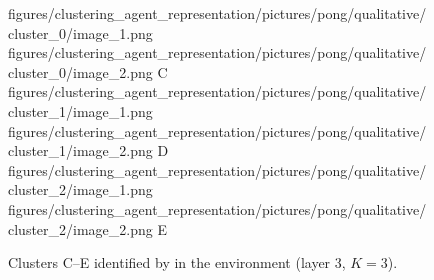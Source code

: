 \begin{figure}[H]
    \qualitativeClusterFigureSetup
    \qualitativeClusterTwo
        {figures/clustering_agent_representation/pictures/pong/qualitative/cluster_0/image_1.png}
        {figures/clustering_agent_representation/pictures/pong/qualitative/cluster_0/image_2.png}
        {C}
    \qualitativeClusterTwo
        {figures/clustering_agent_representation/pictures/pong/qualitative/cluster_1/image_1.png}
        {figures/clustering_agent_representation/pictures/pong/qualitative/cluster_1/image_2.png}
        {D}
    \qualitativeClusterTwo
        {figures/clustering_agent_representation/pictures/pong/qualitative/cluster_2/image_1.png}
        {figures/clustering_agent_representation/pictures/pong/qualitative/cluster_2/image_2.png}
        {E}
    \caption{Clusters C--E identified by  in the \PongName environment (layer 3, $K=3$).}
    \label{fig:qualitative_pong}
\end{figure}
